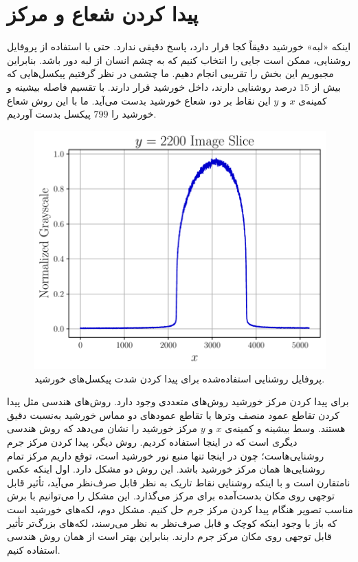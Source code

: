 \documentclass[12pt,a4paper]{article}
\begin{document}
	\section{پیدا کردن شعاع و مرکز}
	اینکه «لبه» خورشید دقیقاً کجا قرار دارد، پاسخ دقیقی ندارد. حتی با استفاده از پروفایل روشنایی، ممکن است جایی را
	انتخاب کنیم که به چشم انسان از لبه دور باشد. بنابراین مجبوریم این بخش را تقریبی انجام دهیم. ما چشمی در نظر گرفتیم
	پیکسل‌هایی که بیش از $15$ درصد روشنایی دارند، داخل خورشید قرار دارند. با تقسیم فاصله بیشینه و کمینه‌ی $x$ و $y$ این
	نقاط بر دو، شعاع خورشید بدست می‌آید. ما با این روش شعاع خورشید را $799$ پیکسل بدست آوردیم.
	\begin{figure}
		\centering
		\includegraphics[width=0.8\linewidth]{../fig/slice}
		\caption{پروفایل روشنایی استفاده‌شده برای پیدا کردن شدت پیکسل‌های خورشید.}
	\end{figure}
	برای پیدا کردن مرکز خورشید روش‌های متعددی وجود دارد. روش‌های هندسی مثل پیدا کردن تقاطع عمود منصف وتر‌ها یا تقاطع
	عمود‌های دو مماس خورشید به‌نسبت دقیق هستند. وسط بیشینه و کمینه‌ی $x$ و $y$ مرکز خورشید را نشان می‌دهد که
	روش هندسی دیگری است که در اینجا استفاده کردیم. روش دیگر، پیدا کردن مرکز جرم روشنایی‌هاست؛ چون در اینجا تنها منبع
	نور خورشید است، توقع داریم مرکز تمام روشنایی‌ها همان مرکز خورشید باشد. این روش دو مشکل دارد. اول اینکه عکس نامتقارن
	است و با اینکه روشنایی نقاط تاریک به نظر قابل صرف‌نظر می‌آید، تأثیر قابل توجهی روی مکان بدست‌آمده برای مرکز می‌گذارد.
	این مشکل را می‌توانیم با برش مناسب تصویر هنگام پیدا کردن مرکز جرم حل کنیم. مشکل دوم، لکه‌های خورشید است که باز با
	وجود اینکه کوچک و قابل صرف‌نظر به نظر می‌رسند، لکه‌های بزرگ‌تر تأثیر قابل توجهی روی مکان مرکز جرم دارند. بنابراین
	بهتر است از همان روش هندسی استفاده کنیم.
\end{document}
